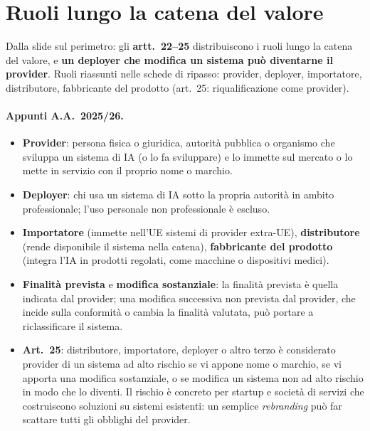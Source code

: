 \section{Ruoli lungo la catena del valore}
\label{sec:aiact-ruoli}

Dalla slide sul perimetro: gli \textbf{artt.~22--25} distribuiscono i ruoli lungo la catena del valore,
e \textbf{un deployer che modifica un sistema può diventarne il provider}. Ruoli riassunti nelle schede
di ripasso: provider, deployer, importatore, distributore, fabbricante del prodotto (art.~25:
riqualificazione come provider).

\paragraph{Appunti A.A.~2025/26.}
\begin{itemize}
  \item \textbf{Provider}: persona fisica o giuridica, autorità pubblica o organismo che sviluppa un
    sistema di IA (o lo fa sviluppare) e lo immette sul mercato o lo mette in servizio con il proprio
    nome o marchio.
  \item \textbf{Deployer}: chi usa un sistema di IA sotto la propria autorità in ambito
    professionale; l'uso personale non professionale è escluso.
  \item \textbf{Importatore} (immette nell'UE sistemi di provider extra-UE), \textbf{distributore}
    (rende disponibile il sistema nella catena), \textbf{fabbricante del prodotto} (integra l'IA in
    prodotti regolati, come macchine o dispositivi medici).
  \item \textbf{Finalità prevista} e \textbf{modifica sostanziale}: la finalità prevista è quella
    indicata dal provider; una modifica successiva non prevista dal provider, che incide sulla
    conformità o cambia la finalità valutata, può portare a riclassificare il sistema.
  \item \textbf{Art.~25}: distributore, importatore, deployer o altro terzo è considerato provider di un
    sistema ad alto rischio se vi appone nome o marchio, se vi apporta una modifica sostanziale, o se
    modifica un sistema non ad alto rischio in modo che lo diventi. Il rischio è concreto per startup e
    società di servizi che costruiscono soluzioni su sistemi esistenti: un semplice \emph{rebranding}
    può far scattare tutti gli obblighi del provider.
\end{itemize}

